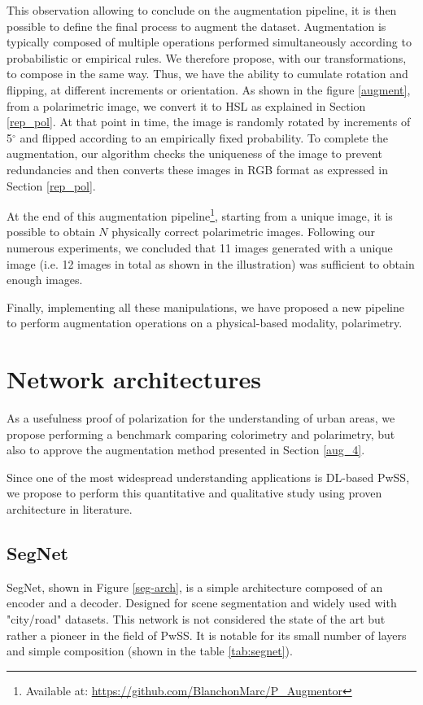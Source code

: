 This observation allowing to conclude on the augmentation pipeline, it is then possible to define the final process to augment the dataset.
Augmentation is typically composed of multiple operations performed simultaneously according to probabilistic or empirical rules. 
We therefore propose, with our transformations, to compose in the same way. Thus, we have the ability to cumulate rotation and flipping, at different increments or orientation.
As shown in the figure \ref{augment}, from a polarimetric image, we convert it to HSL as explained in Section \ref{rep_pol}. At that point in time, the image is randomly rotated by increments of 5$^\circ$ and flipped according to an empirically fixed probability. To complete the augmentation, our algorithm checks the uniqueness of the image to prevent redundancies and then converts these images in RGB format as expressed in Section \ref{rep_pol}.


At the end of this augmentation pipeline\footnote{Available at: \url{https://github.com/BlanchonMarc/P_Augmentor}}, starting from a unique image, it is possible to obtain $N$ physically correct polarimetric images. Following our numerous experiments, we concluded that 11 images generated with a unique image (i.e. 12 images in total as shown in the illustration) was sufficient to obtain enough images. 


Finally, implementing all these manipulations, we have proposed a new pipeline to perform augmentation operations on a physical-based modality, polarimetry.


\section{Network architectures}\label{net_4}

As a usefulness proof of polarization for the understanding of urban areas, we propose performing a benchmark comparing colorimetry and polarimetry, but also to approve the augmentation method presented in Section \ref{aug_4}.

Since one of the most widespread understanding applications is DL-based PwSS, we propose to perform this quantitative and qualitative study using proven architecture in literature.

\subsection{SegNet}\label{segnet_sec}

SegNet\cite{DBLP:journals/corr/BadrinarayananH15}, shown in Figure \ref{seg-arch}, is a simple architecture composed of an encoder and a decoder. Designed for scene segmentation and widely used with "city/road" datasets.  This network is not considered the state of the art but rather a pioneer in the field of PwSS.  It is notable for its small number of layers and simple composition (shown in the table \ref{tab:segnet}). 


